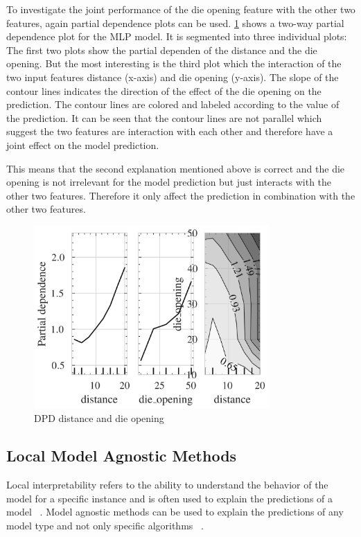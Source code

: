 To investigate the joint performance of the die opening feature with the other two features,
again partial dependence plots can be used.
\cref{fig:dpd-distance-die-opening} shows a two-way partial dependence plot for the
\ac{MLP} model.
It is segmented into three individual plots: The first two plots show the partial dependen of the distance and the
die opening.
But the most interesting is the third plot which the interaction of the two input features distance (x-axis) and die
opening (y-axis).
The slope of the contour lines indicates the direction of the effect of the die opening on the
prediction.
The contour lines are colored and labeled according to the value of the prediction.
It can be seen that the contour lines are not parallel which suggest the two features are
interaction with each other and therefore have a joint effect on the model prediction.

This means that the second explanation mentioned above is correct and the die opening is not irrelevant for the model
prediction but just interacts with the other two features.
Therefore it only affect the prediction in combination with the other two features.

\begin{figure}[h]
    \begin{tcolorbox}[arc=0pt,boxrule=0.5pt]
        \centering
        \includegraphics[width=0.8\textwidth]{chap5/images/pdp_distance_die_opening}
    \end{tcolorbox}
    \caption{DPD distance and die opening}
    \label{fig:dpd-distance-die-opening}
\end{figure}

\subsection{Local Model Agnostic Methods}\label{subsec:local-model-agnostic-methods}
Local interpretability refers to the ability to understand the behavior of the model for a
specific instance and is often used to explain the predictions of a model
~\cite[p. 19]{hall2019introduction}.
Model agnostic methods can be used to explain the predictions of any model type and not only specific algorithms
~\cite[p. 20]{hall2019introduction}.

